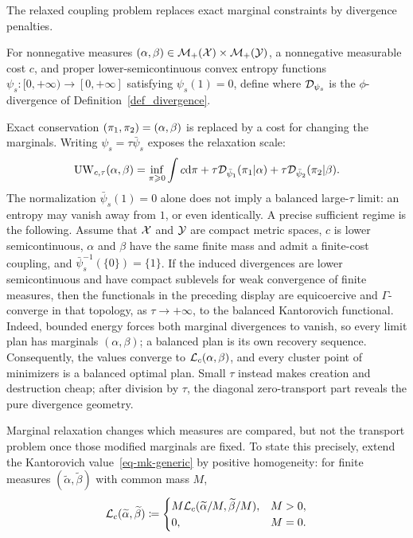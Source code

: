 The relaxed coupling problem replaces exact marginal constraints by divergence penalties.
\begin{defn}\label{def-unbalanced-optimal-transport}
For nonnegative measures $(\alpha,\beta) \in \mathcal{M}_+(\mathcal{X}) \times \mathcal{M}_+(\mathcal{Y})$, a nonnegative measurable cost $c$, and proper lower-semicontinuous convex entropy functions $\psi_s:[0,+\infty)\to[0,+\infty]$ satisfying $\psi_s(1)=0$, define
where $\mathcal{D}_{\psi_s}$ is the $\phi$-divergence of Definition~\ref{def_divergence}.
\end{defn}
Exact conservation $(\pi_1,\pi_2)=(\alpha,\beta)$ is replaced by a cost for changing the marginals. Writing $\psi_s=\tau\bar\psi_s$ exposes the relaxation scale:
\[
	\operatorname{UW}_{c,\tau}(\alpha,\beta)
	=
	\inf_{\pi\geqslant0}
	\int c\mathrm{d}\pi
	+
	\tau\mathcal{D}_{\bar\psi_1}(\pi_1|\alpha)
	+
	\tau\mathcal{D}_{\bar\psi_2}(\pi_2|\beta).
\]
The normalization $\bar\psi_s(1)=0$ alone does not imply a balanced large-$\tau$ limit: an entropy may vanish away from $1$, or even identically. A precise sufficient regime is the following. Assume that $\mathcal{X}$ and $\mathcal{Y}$ are compact metric spaces, $c$ is lower semicontinuous, $\alpha$ and $\beta$ have the same finite mass and admit a finite-cost coupling, and
$\bar\psi_s^{-1}(\{0\})=\{1\}$. If the induced divergences are lower semicontinuous and have compact sublevels for weak convergence of finite measures, then the functionals in the preceding display are equicoercive and $\Gamma$-converge in that topology, as $\tau\to+\infty$, to the balanced Kantorovich functional. Indeed, bounded energy forces both marginal divergences to vanish, so every limit plan has marginals $(\alpha,\beta)$; a balanced plan is its own recovery sequence. Consequently, the values converge to $\mathcal{L}_c(\alpha,\beta)$, and every cluster point of minimizers is a balanced optimal plan. Small $\tau$ instead makes creation and destruction cheap; after division by $\tau$, the diagonal zero-transport part reveals the pure divergence geometry.

Marginal relaxation changes which measures are compared, but not the transport problem once those modified marginals are fixed. To state this precisely, extend the Kantorovich value~\eqref{eq-mk-generic} by positive homogeneity: for finite measures $(\widetilde\alpha,\widetilde\beta)$ with common mass $M$,
\begin{equation}\label{eq-finite-mass-kantorovich-extension}
	\mathcal{L}_c(\widetilde\alpha,\widetilde\beta)
	\coloneqq
	\begin{cases}
		M\mathcal{L}_c(\widetilde\alpha/M,\widetilde\beta/M),&M>0,\\
		0,&M=0.
	\end{cases}
\end{equation}

